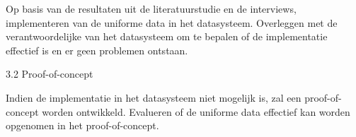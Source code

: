 Op basis van de resultaten uit de literatuurstudie en de interviews, implementeren van de uniforme data in het datasysteem.
Overleggen met de verantwoordelijke van het datasysteem om te bepalen of de implementatie effectief is en er geen problemen ontstaan.

3.2 Proof-of-concept

Indien de implementatie in het datasysteem niet mogelijk is, zal een proof-of-concept worden ontwikkeld.
Evalueren of de uniforme data effectief kan worden opgenomen in het proof-of-concept.


\lipsum[21-25]


